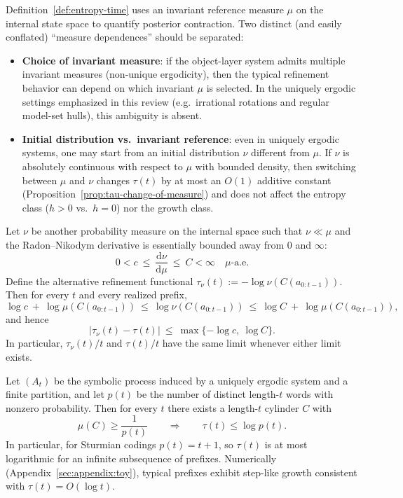 \begin{remark}\label{rem:tau-measure-dependence}
Definition~\ref{def:entropy-time} uses an invariant reference measure $\mu$ on the internal state space to quantify posterior contraction. Two distinct (and easily conflated) ``measure dependences'' should be separated:
\begin{itemize}[leftmargin=*,itemsep=2pt]
  \item \textbf{Choice of invariant measure}: if the object-layer system admits multiple invariant measures (non-unique ergodicity), then the typical refinement behavior can depend on which invariant $\mu$ is selected. In the uniquely ergodic settings emphasized in this review (e.g.\ irrational rotations and regular model-set hulls), this ambiguity is absent.
  \item \textbf{Initial distribution vs.\ invariant reference}: even in uniquely ergodic systems, one may start from an initial distribution $\nu$ different from $\mu$. If $\nu$ is absolutely continuous with respect to $\mu$ with bounded density, then switching between $\mu$ and $\nu$ changes $\tau(t)$ by at most an $O(1)$ additive constant (Proposition~\ref{prop:tau-change-of-measure}) and does not affect the entropy class ($h>0$ vs.\ $h=0$) nor the growth class.
\end{itemize}
\end{remark}

\begin{proposition}\label{prop:tau-change-of-measure}
Let $\nu$ be another probability measure on the internal space such that $\nu\ll \mu$ and the Radon--Nikodym derivative is essentially bounded away from $0$ and $\infty$:
\[
0<c\ \le\ \frac{\mathrm{d}\nu}{\mathrm{d}\mu}\ \le\ C<\infty
\quad\text{$\mu$-a.e.}
\]
Define the alternative refinement functional $\tau_\nu(t):=-\log \nu(C(a_{0:t-1}))$. Then for every $t$ and every realized prefix,
\[
\log c\ +\ \log \mu(C(a_{0:t-1}))\ \le\ \log \nu(C(a_{0:t-1}))\ \le\ \log C\ +\ \log \mu(C(a_{0:t-1})),
\]
and hence
\[
|\tau_\nu(t)-\tau(t)|\ \le\ \max\{-\log c,\ \log C\}.
\]
In particular, $\tau_\nu(t)/t$ and $\tau(t)/t$ have the same limit whenever either limit exists.
\end{proposition}

\begin{proposition}\label{prop:log-bound}
Let $(A_t)$ be the symbolic process induced by a uniquely ergodic system and a finite partition, and let $p(t)$ be the number of distinct length-$t$ words with nonzero probability. Then for every $t$ there exists a length-$t$ cylinder $C$ with
\[
\mu(C)\ge \frac{1}{p(t)} \qquad\Rightarrow\qquad \tau(t)\le \log p(t).
\]
In particular, for Sturmian codings $p(t)=t+1$, so $\tau(t)$ is at most logarithmic for an infinite subsequence of prefixes. Numerically (Appendix~\ref{sec:appendix:toy}), typical prefixes exhibit step-like growth consistent with $\tau(t)=O(\log t)$.
\end{proposition}

